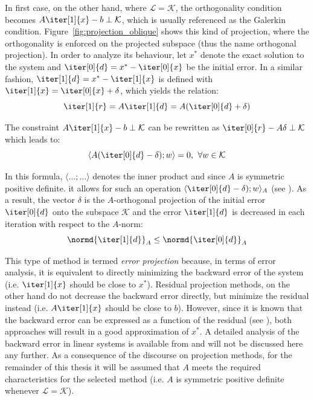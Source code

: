\noindent In first case, on the other hand, where $\mathcal{L}=\mathcal{K}$, the orthogonality condition becomes $A\iter[1]{x}-b \perp \mathcal{K}$, which is usually referenced as the Galerkin condition. Figure~\hyperref[fig:projection_oblique]{\ref{fig:projection_oblique}} shows this kind of projection, where the orthogonality is enforced on the projected subspace (thus the name orthogonal projection). In order to analyze its behaviour, let $x^*$ denote the exact solution to the system and $\iter[0]{d}=x^*-\iter[0]{x}$ be the initial error. In a similar fashion, $\iter[1]{d} = x^*-\iter[1]{x}$ is defined with $\iter[1]{x}=\iter[0]{x}+\delta$, which yields the relation:
\begin{equation}
    \iter[1]{r} = A\iter[1]{d} = A(\iter[0]{d}+\delta)
\end{equation}

\noindent The constraint $A\iter[1]{x}-b \perp \mathcal{K}$ can be rewritten as $\iter[0]{r}-A\delta \perp \mathcal{K}$ which leads to:
\begin{equation}
    \langle A(\iter[0]{d}-\delta); w\rangle = 0\text{,}\;\; \forall w \in \mathcal{K}
\end{equation}

\noindent In this formula, $\langle\dots;\dots\rangle$ denotes the inner product and since $A$ is symmetric positive definite. it allows for such an operation $\langle \iter[0]{d}-\delta); w\rangle_A$ (see \cite{saad_iterative_2003}). As a result, the vector $\delta$ is the $A$-orthogonal projection of the initial error $\iter[0]{d}$ onto the subspace $\mathcal{K}$ and the error $\iter[1]{d}$ is decreased in each iteration with respect to the $A$-norm:
\begin{equation}
    \normd{\iter[1]{d}}_A \leq \normd{\iter[0]{d}}_A
\end{equation}

\noindent This type of method is termed \textit{error projection} because, in terms of error analysis, it is equivalent to directly minimizing the backward error of the system (i.e. $\iter[1]{x}$ should be close to $x^*$). Residual projection methods, on the other hand do not decrease the backward error directly, but minimize the residual instead (i.e. $A\iter[1]{x}$ should be close to $b$). However, since it is known that the backward error can be expressed as a function of the residual (see \cite{rigal_compatibility_1967}), both approaches will result in a good approximation of $x^*$. A detailed analysis of the backward error in linear systems is available from \cite{higham_accuracy_2002} and will not be discussed here any further. As a consequence of the discourse on projection methods, for the remainder of this thesis it will be assumed that $A$ meets the required characteristics for the selected method (i.e. $A$ is symmetric positive definite whenever $\mathcal{L}=\mathcal{K}$).

